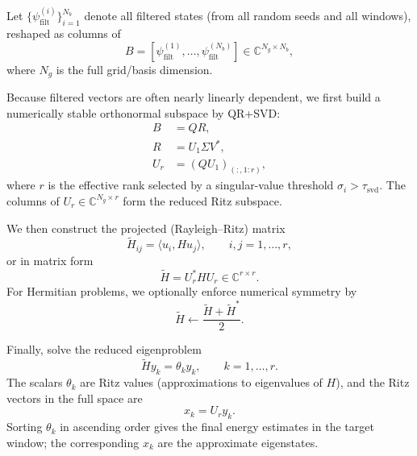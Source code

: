 Let $\{\psi^{(i)}_{\mathrm{filt}}\}_{i=1}^{N_b}$ denote all filtered states
(from all random seeds and all windows), reshaped as columns of
\begin{equation}
B = [\psi^{(1)}_{\mathrm{filt}},\ldots,\psi^{(N_b)}_{\mathrm{filt}}]
\in \mathbb{C}^{N_g\times N_b},
\end{equation}
where $N_g$ is the full grid/basis dimension.

Because filtered vectors are often nearly linearly dependent, we first build a
numerically stable orthonormal subspace by QR+SVD:
\begin{align}
B &= QR,\\
R &= U_1 \Sigma V^\ast,\\
U_r &= (Q U_1)_{(:,1:r)},
\end{align}
where $r$ is the effective rank selected by a singular-value threshold
$\sigma_i>\tau_{\mathrm{svd}}$. The columns of $U_r\in\mathbb{C}^{N_g\times r}$
form the reduced Ritz subspace.

We then construct the projected (Rayleigh--Ritz) matrix
\begin{equation}
\widetilde{H}_{ij}
= \langle u_i, H u_j\rangle,
\qquad i,j=1,\ldots,r,
\label{eq:Htilde}
\end{equation}
or in matrix form
\begin{equation}
\widetilde{H}=U_r^\ast H U_r\in\mathbb{C}^{r\times r}.
\end{equation}
For Hermitian problems, we optionally enforce numerical symmetry by
\begin{equation}
\widetilde{H}\leftarrow \frac{\widetilde{H}+\widetilde{H}^\ast}{2}.
\end{equation}

Finally, solve the reduced eigenproblem
\begin{equation}
\widetilde{H} y_k = \theta_k y_k,
\qquad k=1,\ldots,r.
\end{equation}
The scalars $\theta_k$ are Ritz values (approximations to eigenvalues of $H$),
and the Ritz vectors in the full space are
\begin{equation}
x_k = U_r y_k.
\end{equation}
Sorting $\theta_k$ in ascending order gives the final energy estimates in the
target window; the corresponding $x_k$ are the approximate eigenstates.

